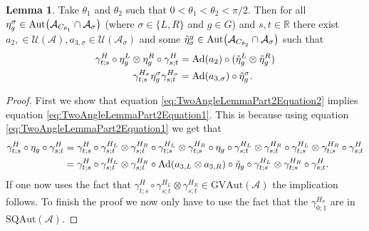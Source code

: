 \documentclass[12pt,a4paper,twoside]{article}
\let\originalleft\left
\let\originalright\right
\renewcommand{\left}{\mathopen{}\mathclose\bgroup\originalleft}
\renewcommand{\right}{\aftergroup\egroup\originalright}
\newcommand{\UU}{\mathcal U}
\renewcommand{\AA}{\mathcal A}
\newcommand{\RR}{\mathbb R}
\newcommand{\Ad}[1]{\textrm{Ad}\left(#1\right)}
\newcommand{\Aut}[1]{\textrm{Aut}\left(#1\right)}
\theoremstyle{definition}
\newtheorem{lemma}[theorem]{Lemma}
\numberwithin{equation}{section}
\begin{document}
\begin{lemma}\label{lem:TwoAngleLemmaPart2}
	Take $\theta_1$ and $\theta_2$ such that $0<\theta_1<\theta_2<\pi/2$. Then for all $\eta_{g}^{\sigma}\in\Aut{\AA_{C_{\theta_1}}\cap\AA_{\sigma}}$ (where $\sigma\in\{L,R\}$ and $g\in G$) and $s,t\in\RR$ there exist $a_{2},\in\UU(\AA),a_{3,\sigma}\in\UU(\AA_\sigma)$ and some $\tilde{\eta}_{\sigma}^g\in \Aut{\AA_{C_{\theta_2}}\cap\AA_{\sigma}}$ such that
	\begin{align}
		\label{eq:TwoAngleLemmaPart2Equation1}
		\gamma^{H}_{t;s}\circ\eta_{g}^L\otimes\eta_{g}^R\circ\gamma^{H}_{s;t}&=\Ad{a_2}\circ(\tilde\eta_{g}^L \otimes\tilde\eta_{g}^R)\\
		\label{eq:TwoAngleLemmaPart2Equation2}
		\gamma^{H_\sigma}_{t;s}\eta_g^\sigma\gamma^{H_\sigma}_{s;t}&=\Ad{a_{3,\sigma}}\circ \tilde\eta_{g}^\sigma.
	\end{align}
\end{lemma}
\begin{proof}
	First we show that equation \eqref{eq:TwoAngleLemmaPart2Equation2} implies equation \eqref{eq:TwoAngleLemmaPart2Equation1}. This is because using equation \eqref{eq:TwoAngleLemmaPart2Equation1} we get that
	\begin{align}
		\gamma^H_{t;s}\circ\eta_g\circ\gamma^{H}_{s;t}&=\gamma^H_{t;s}\circ\gamma^{H_L}_{s;t}\otimes\gamma^{H_R}_{s;t}\circ\gamma^{H_L}_{t;s}\otimes\gamma^{H_R}_{t;s}\circ\eta_g\circ\gamma^{H_L}_{s;t}\otimes\gamma^{H_R}_{s;t}\circ\gamma^{H_L}_{t;s}\otimes\gamma^{H_R}_{t;s}\circ\gamma^H_{s;t}\\
		&=\gamma^H_{t;s}\circ\gamma^{H_L}_{s;t}\otimes\gamma^{H_R}_{s;t}\circ\Ad{a_{3,L}\otimes a_{3,R}}\circ\tilde{\eta}_g\circ\gamma^{H_L}_{t;s}\otimes\gamma^{H_R}_{t;s}\circ\gamma^H_{s;t}.
	\end{align}
	If one now uses the fact that $\gamma^H_{t;s}\circ\gamma^{H_L}_{s;t}\otimes\gamma^{H_R}_{s;t}\in\textrm{GVAut}(\AA)$ the implication follows. To finish the proof we now only have to use the fact that the $\gamma^{H_\sigma}_{0;1}$ are in $\textrm{SQAut}(\AA)$.
\end{proof}


\end{document}

